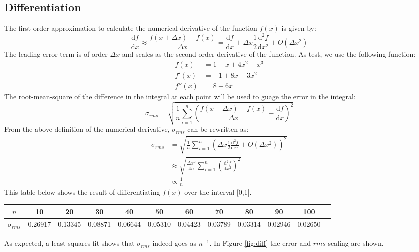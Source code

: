 \documentclass{scrartcl}
\begin{document}
\subsection{Differentiation}
The first order approximation to calculate the numerical derivative of the function $f(x)$ is given by:
\begin{equation}
	\frac{\textrm{d}f}{\textrm{d}x}\approx\frac{f(x+\Delta x)-f(x)}{\Delta x}=\frac{\textrm{d}f}{\textrm{d}x}+\Delta x\frac{1}{2}\frac{\textrm{d}^{2}f}{\textrm{d}x^{2}}+O(\Delta x^{2})
\end{equation}
The leading error term is of order $\Delta x$ and scales as the second order derivative of the function.
As test, we use the following function:
\begin{align*}
	f(x)&=1-x+4x^{2}-x^{3} \\
	f'(x)&=-1+8x-3x^{2} \\
	f''(x)&=8-6x
\end{align*}
The root-mean-square of the difference in the integral at each point will be used to guage the error in the integral:
\begin{equation}
	\sigma_{rms}=\sqrt{\frac{1}{n}\sum_{i=1}^{n}{(\frac{f(x+\Delta x)-f(x)}{\Delta x}-\frac{\textrm{d}f}{\textrm{d}x})^{2}}}
\end{equation}
From the above definition of the numerical derivative, $\sigma_{rms}$ can be rewritten as:
\begin{align*}
\sigma_{rms}&=\sqrt{\frac{1}{n}\sum_{i=1}^{n}{(\Delta x\frac{1}{2}\frac{\textrm{d}^{2}f}{\textrm{d}x^{2}}+O(\Delta x^{2}))^{2}}}\\
	&\approx\sqrt{\frac{\Delta x^{2}}{4n}\sum_{i=1}^{n}{(\frac{\textrm{d}^{2}f}{\textrm{d}x^{2}})^{2}}}\\
	&\propto \frac{1}{n}
\end{align*}
This table below shows the result of differentiating $f(x)$ over the interval [0,1].
\begin{center}
	\begin{tabular}{c|ccccccccccc}
		$n$ & 10 & 20 & 30 & 40 & 50 & 60 & 70 & 80 & 90 & 100 \\\hline
		$\sigma_{rms}$ & 0.26917 & 0.13345 & 0.08871 & 0.06644 & 0.05310 & 0.04423 & 0.03789 & 0.03314 & 0.02946 & 0.02650
	\end{tabular}
\end{center}
As expected, a least squares fit shows that $\sigma_{rms}$ indeed goes as $n^{-1}$.
In Figure \ref{fig:diff} the error and $rms$ scaling are shown.
\end{document}
